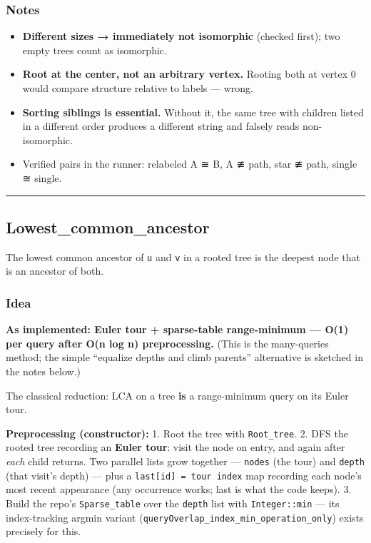 \documentclass[
  10pt,
  letterpaper,
  onecolumn]{article}
\providecommand{\tightlist}{%
  \setlength{\itemsep}{0pt}\setlength{\parskip}{0pt}}
\begin{document}
\hypertarget{notes-11}{%
\subsubsection{Notes}\label{notes-11}}

\begin{itemize}
\tightlist
\item
  \textbf{Different sizes → immediately not isomorphic} (checked first);
  two empty trees count as isomorphic.
\item
  \textbf{Root at the center, not an arbitrary vertex.} Rooting both at
  vertex 0 would compare structure relative to labels --- wrong.
\item
  \textbf{Sorting siblings is essential.} Without it, the same tree with
  children listed in a different order produces a different string and
  falsely reads non-isomorphic.
\item
  Verified pairs in the runner: relabeled A ≅ B, A ≇ path, star ≇ path,
  single ≅ single.
\end{itemize}

\begin{center}\rule{0.5\linewidth}{0.5pt}\end{center}

\hypertarget{lowest_common_ancestor}{%
\subsection{Lowest\_common\_ancestor}\label{lowest_common_ancestor}}

The lowest common ancestor of \texttt{u} and \texttt{v} in a rooted tree
is the deepest node that is an ancestor of both.

\hypertarget{idea-13}{%
\subsubsection{Idea}\label{idea-13}}

\textbf{As implemented: Euler tour + sparse-table range-minimum --- O(1)
per query after O(n log n) preprocessing.} (This is the many-queries
method; the simple ``equalize depths and climb parents'' alternative is
sketched in the notes below.)

The classical reduction: LCA on a tree \textbf{is} a range-minimum query
on its Euler tour.

\textbf{Preprocessing (constructor):} 1. Root the tree with
\texttt{Root\_tree}. 2. DFS the rooted tree recording an \textbf{Euler
tour}: visit the node on entry, and again after \emph{each} child
returns. Two parallel lists grow together --- \texttt{nodes} (the tour)
and \texttt{depth} (that visit's depth) --- plus a
\texttt{last{[}id{]}\ =\ tour\ index} map recording each node's most
recent appearance (any occurrence works; last is what the code keeps).
3. Build the repo's \texttt{Sparse\_table} over the \texttt{depth} list
with \texttt{Integer::min} --- its index-tracking argmin variant
(\texttt{queryOverlap\_index\_min\_operation\_only}) exists precisely
for this.
\end{document}
